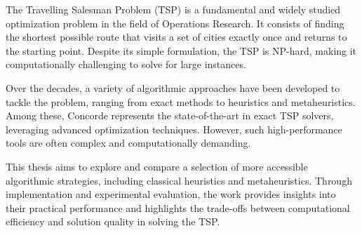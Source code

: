The Travelling Salesman Problem (TSP) is a fundamental and widely studied optimization problem in the field of Operations Research. It consists of finding the shortest possible route that visits a set of cities exactly once and returns to the starting point. Despite its simple formulation, the TSP is NP-hard, making it computationally challenging to solve for large instances.

Over the decades, a variety of algorithmic approaches have been developed to tackle the problem, ranging from exact methods to heuristics and metaheuristics. Among these, Concorde represents the state-of-the-art in exact TSP solvers, leveraging advanced optimization techniques. However, such high-performance tools are often complex and computationally demanding.

This thesis aims to explore and compare a selection of more accessible algorithmic strategies, including classical heuristics and metaheuristics. Through implementation and experimental evaluation, the work provides insights into their practical performance and highlights the trade-offs between computational efficiency and solution quality in solving the TSP.
